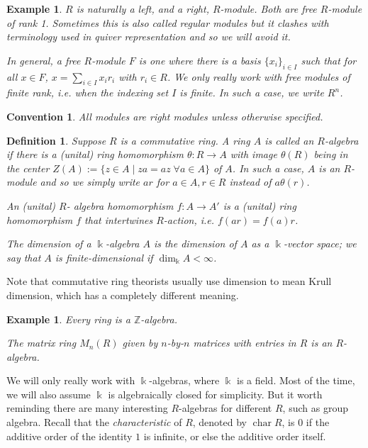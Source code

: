 \documentclass[11pt,a4paper]{article}
\numberwithin{equation}{section}
\theoremstyle{all}
\newtheorem{example}[theorem]{Example}
\newtheorem{definition}[theorem]{Definition}
\newtheorem*{convention}{Convention}
\theoremstyle{remark}
\newcommand{\Z}{\mathbb{Z}}
\DeclareMathOperator{\Char}{char}
\newcommand{\defn}[1]{\textsl{\color{darkblue} #1}}
\begin{document}
\begin{example}
$R$ is naturally a left, and a right, $R$-module.  Both are \defn{free} $R$-module of rank 1.  Sometimes this is also called regular modules but it clashes with terminology used in quiver representation and so we will avoid it.

In general, a free $R$-module $F$ is one where there is a basis $\{x_i\}_{i\in I}$ such that for all $x\in F$, $x=\sum_{i\in I} x_ir_i$ with $r_i\in R$.  We only really work with free modules of finite rank, i.e. when the indexing set $I$ is finite.  In such a case, we write $R^n$.
\end{example}

\begin{convention}
All modules are right modules unless otherwise specified.
\end{convention}

\begin{definition}
Suppose $R$ is a \emph{commutative} ring.
A ring $A$ is called an \defn{$R$-algebra} if there is a (unital) ring homomorphism $\theta:R\to A$ with image $\theta(R)$ being in the \defn{center} $Z(A):=\{z\in A\mid za=az\;\forall a\in A\}$ of $A$.
In such a case, $A$ is an $R$-module and so we simply write $ar$ for $a\in A,r\in R$ instead of $a\theta(r)$.

An (unital) $R$-\defn{algebra homomorphism} $f:A\to A'$ is a (unital) ring homomorphism $f$ that \defn{intertwines} $R$-action, i.e. $f(ar)=f(a)r$.

The \defn{dimension} of a $\Bbbk$-algebra $A$ is the dimension of $A$ as a $\Bbbk$-vector space; we say that $A$ is \defn{finite-dimensional} if $\dim_{\Bbbk} A<\infty$.
\end{definition}

Note that commutative ring theorists usually use dimension to mean Krull dimension, which has a completely different meaning.

\begin{example}
Every ring is a $\Z$-algebra.

The matrix ring $M_n(R)$ given by $n$-by-$n$ matrices with entries in $R$ is an $R$-algebra.
\end{example}

We will only really work with $\Bbbk$-algebras, where $\Bbbk$ is a field.
Most of the time, we will also assume $\Bbbk$ is algebraically closed for simplicity.
But it worth reminding there are many interesting $R$-algebras for different $R$, such as group algebra.
Recall that the \defn{characteristic} of $R$, denoted by $\Char R$, is $0$ if the additive order of the identity $1$ is infinite, or else the additive order itself.
\end{document}
